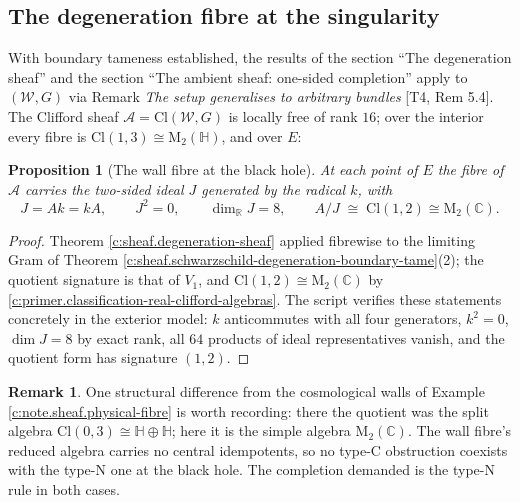 \documentclass[11pt]{article}
\newtheorem{proposition}[theorem]{Proposition}
\theoremstyle{definition}
\newtheorem{remark}[theorem]{Remark}
\theoremstyle{plain}
\newcommand{\changedmark}[2]{\marginpar{\raggedright\scriptsize\color{#1}#2}}
\providecommand{\C}{}\renewcommand{\C}{\mathbb{C}}
\providecommand{\Cl}{}\renewcommand{\Cl}{\mathrm{Cl}}
\providecommand{\HH}{}\renewcommand{\HH}{\mathbb{H}}
\providecommand{\Mat}{}\renewcommand{\Mat}{\mathrm{M}}
\providecommand{\R}{}\renewcommand{\R}{\mathbb{R}}
\providecommand{\shA}{}\renewcommand{\shA}{\mathcal{A}}
\providecommand{\shW}{}\renewcommand{\shW}{\mathcal{W}}
\begin{document}
\subsection*{The degeneration fibre at the singularity}
\label{c:note.sheaf.setting-degeneration-fibre-singularity}
With boundary tameness established, the results of the section ``The degeneration sheaf'' and the section ``The ambient sheaf: one-sided completion'' apply to $(\shW, G)$ via Remark \emph{The setup generalises to arbitrary bundles} [T4, Rem 5.4]. The Clifford sheaf $\shA = \Cl(\shW, G)$ is locally free of rank $16$; over the interior every fibre is $\Cl(1,3) \cong \Mat_2(\HH)$, and over $E$:

\begin{proposition}[The wall fibre at the black hole]\label{c:sheaf.wall-fibre-black-hole}
\changedmark{gray}{reworded}
At each point of $E$ the fibre of $\shA$ carries the two-sided ideal $J$ generated by the radical $k$, with
\[
J = A k = k A, \qquad J^2 = 0, \qquad \dim_\R J = 8, \qquad A/J \;\cong\; \Cl(1,2) \cong \Mat_2(\mathbb{C}).
\]
\end{proposition}
\begin{proof}
Theorem \ref{c:sheaf.degeneration-sheaf} applied fibrewise to the limiting Gram of Theorem \ref{c:sheaf.schwarzschild-degeneration-boundary-tame}(2); the quotient signature is that of $V_1$, and $\Cl(1,2) \cong \Mat_2(\C)$ by \ref{c:primer.classification-real-clifford-algebras}. The script verifies these statements concretely in the exterior model: $k$ anticommutes with all four generators, $k^2 = 0$, $\dim J = 8$ by exact rank, all $64$ products of ideal representatives vanish, and the quotient form has signature $(1,2)$.

\end{proof}

\begin{remark}\label{c:note.sheaf.remark-965}
One structural difference from the cosmological walls of Example \ref{c:note.sheaf.physical-fibre} is worth recording: there the quotient was the split algebra $\Cl(0,3) \cong \HH \oplus \HH$; here it is the simple algebra $\Mat_2(\mathbb{C})$. The wall fibre's reduced algebra carries no central idempotents, so no type-C obstruction coexists with the type-N one at the black hole. The completion demanded is the type-N rule in both cases.
\end{remark}
\end{document}

